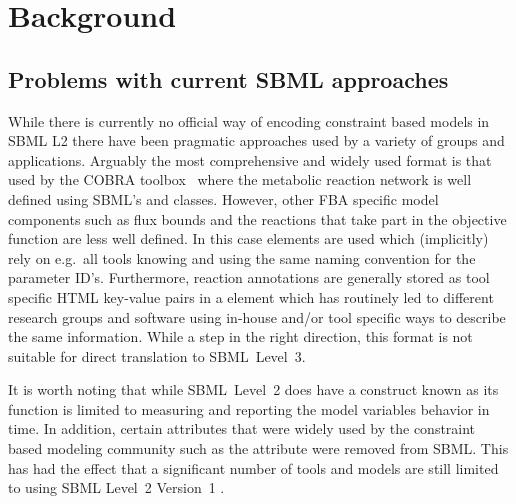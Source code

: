 
\section{Background}
\label{background}

\subsection{Problems with current SBML approaches}

While there is currently no official way of encoding constraint based models
in SBML L2 there have been pragmatic approaches used by a variety of groups
and applications. Arguably the most comprehensive and widely used format is
that used by the \textsf{COBRA toolbox}~\citep{cobra} where the metabolic
reaction network is well defined using SBML's \Reaction and \Species
classes. However, other FBA specific model components such as flux bounds
and the reactions that take part in the objective function are less well
defined. In this case \LocalParameter elements are used which (implicitly)
rely on e.g.~all tools knowing and using the same naming convention for the
parameter ID's. Furthermore, reaction annotations are generally stored as
tool specific HTML key-value pairs in a \Notes element which has routinely
led to different research groups and software using in-house and/or tool
specific ways to describe the same information.
%
%
While a step in the right direction, this format is not suitable for
direct translation to SBML~Level~3.

It is worth noting that while SBML~Level~2 does have a construct known as
\Constraint its function is limited to measuring and reporting the model
variables behavior in time. 
%
In addition, certain attributes that were widely used by the constraint based
modeling community such as the \Species attribute  were
removed from SBML. This has had the effect that a significant number of
tools and models are still limited to using SBML Level~2 Version~1 \citep{oberhardt_2009}.

